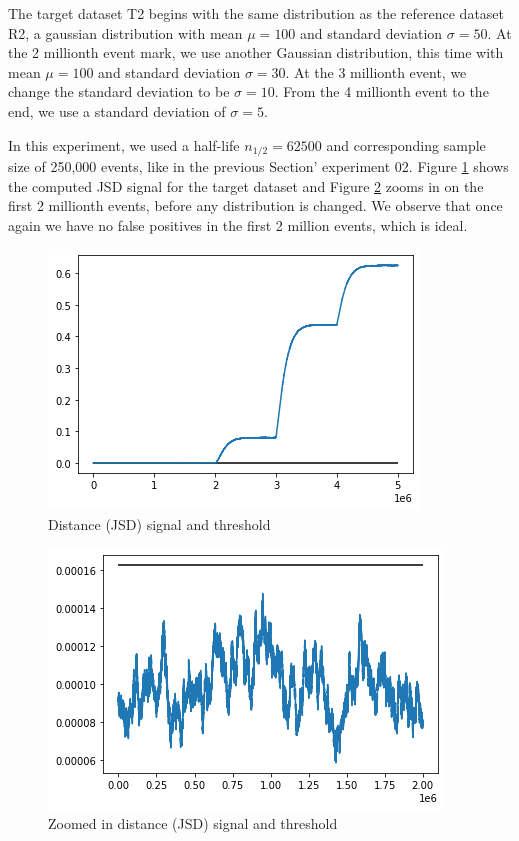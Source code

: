 The target dataset T2 begins with the same distribution as the reference dataset R2, a gaussian distribution with mean $\mu=100$ and standard deviation $\sigma=50$. At the 2 millionth event mark, we use another Gaussian distribution, this time with mean $\mu=100$ and standard deviation $\sigma=30$. At the 3 millionth event, we change the standard deviation to be $\sigma=10$. From the 4 millionth event to the end, we use a standard deviation of $\sigma=5$. 

In this experiment, we used a half-life $n_{1/2}=62500$ and corresponding sample size of 250,000 events, like in the previous Section' experiment 02. Figure \ref{fig:JSD-signal-test02} shows the computed JSD signal for the target dataset and Figure \ref{fig:JSD-signal-zoom-test02} zooms in on the first 2 millionth events, before any distribution is changed. We observe that once again we have no false positives in the first 2 million events, which is ideal. 
\begin{figure}[!htb]
    \begin{center}
      \includegraphics[scale=0.6]{figures/stream-analysis-viz-test02.png}
      \caption[]{Distance (JSD) signal and threshold}
      \label{fig:JSD-signal-test02}
    \end{center}
\end{figure}
\begin{figure}[!htb]
    \begin{center}
      \includegraphics[scale=0.6]{figures/stream-analysis-viz-zoom-test02.png}
      \caption[]{Zoomed in distance (JSD) signal and threshold}
      \label{fig:JSD-signal-zoom-test02}
    \end{center}
\end{figure}
